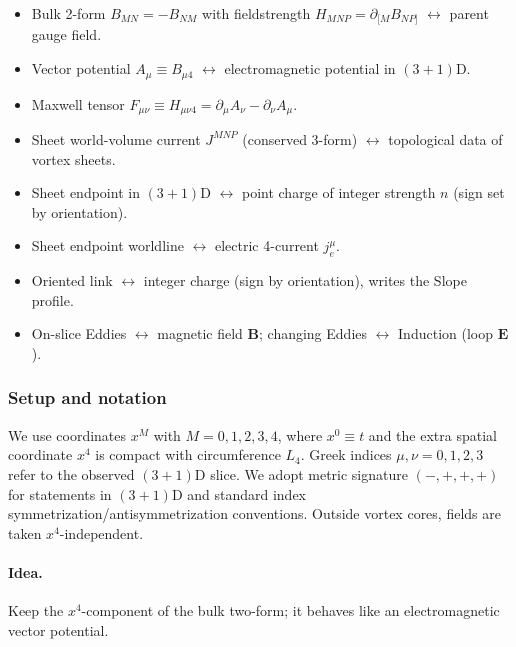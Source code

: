 \begin{tcolorbox}[title=Quick dictionary (objects \(\leftrightarrow\) meanings)]
\begin{itemize}
  \item Bulk 2-form \(B_{MN}=-B_{NM}\) with fieldstrength \(H_{MNP}=\partial_{[M}B_{NP]}\) $\leftrightarrow$ parent gauge field.
  \item Vector potential \(A_\mu\equiv B_{\mu 4}\) $\leftrightarrow$ electromagnetic potential in $(3{+}1)$D.
  \item Maxwell tensor \(F_{\mu\nu}\equiv H_{\mu\nu 4}=\partial_\mu A_\nu-\partial_\nu A_\mu\).
  \item Sheet world-volume current \(J^{MNP}\) (conserved 3-form) $\leftrightarrow$ topological data of vortex sheets.
  \item Sheet endpoint in $(3{+}1)$D $\leftrightarrow$ point charge of integer strength \(n\) (sign set by orientation).
  \item Sheet endpoint worldline $\leftrightarrow$ electric 4-current \(j_e^\mu\).
  \item Oriented link $\leftrightarrow$ integer charge (sign by orientation), writes the Slope profile.
  \item On-slice Eddies $\leftrightarrow$ magnetic field $\mathbf B$; changing Eddies $\leftrightarrow$ Induction (loop $\mathbf E$).
\end{itemize}
\end{tcolorbox}

\subsubsection{Setup and notation}
We use coordinates $x^M$ with $M=0,1,2,3,4$, where $x^0\equiv t$ and the extra spatial coordinate $x^4$ is compact with circumference $L_4$. Greek indices $\mu,\nu=0,1,2,3$ refer to the observed $(3{+}1)$D slice. We adopt metric signature $(-,+,+,+)$ for statements in $(3{+}1)$D and standard index symmetrization/antisymmetrization conventions. Outside vortex cores, fields are taken $x^4$-independent.

\paragraph*{Idea.} Keep the $x^4$-component of the bulk two-form; it behaves like an electromagnetic vector potential.
